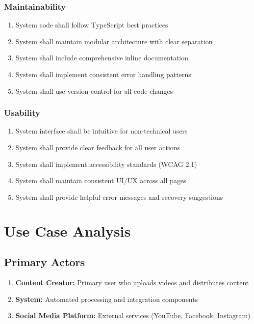 \subsubsection{Maintainability}

\begin{enumerate}[label=NFR5.\arabic*]
    \item System code shall follow TypeScript best practices
    \item System shall maintain modular architecture with clear separation
    \item System shall include comprehensive inline documentation
    \item System shall implement consistent error handling patterns
    \item System shall use version control for all code changes
\end{enumerate}

\subsubsection{Usability}

\begin{enumerate}[label=NFR6.\arabic*]
    \item System interface shall be intuitive for non-technical users
    \item System shall provide clear feedback for all user actions
    \item System shall implement accessibility standards (WCAG 2.1)
    \item System shall maintain consistent UI/UX across all pages
    \item System shall provide helpful error messages and recovery suggestions
\end{enumerate}

\section{Use Case Analysis}

\subsection{Primary Actors}

\begin{enumerate}
    \item \textbf{Content Creator:} Primary user who uploads videos and distributes content
    \item \textbf{System:} Automated processing and integration components
    \item \textbf{Social Media Platform:} External services (YouTube, Facebook, Instagram)
\end{enumerate}

